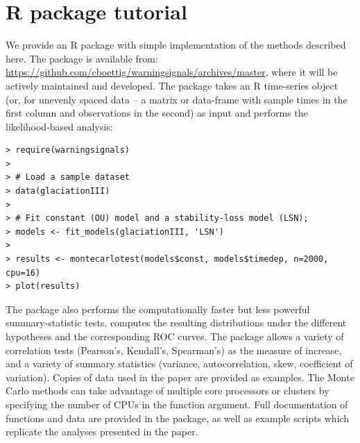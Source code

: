\documentclass[11pt]{elsarticle}
\begin{document}
%
\appendix
\renewcommand*\thefigure{S\arabic{figure}}
\renewcommand*\theequation{S\arabic{equation}}


\section{R package tutorial}\label{R}
We provide an R package with simple implementation of the methods described here.  The package is available from: \href{https://github.com/cboettig/warningsignals/archives/master}{https://github.com/cboettig/warningsignals/archives/master}, where it will be actively maintained and developed.  The package takes an R time-series object (or, for unevenly spaced data -- a matrix or data-frame with sample times in the first column and observations in the second) as input and performs the likelihood-based analysis:

\begin{verbatim}
> require(warningsignals)
>
> # Load a sample dataset
> data(glaciationIII)
>
> # Fit constant (OU) model and a stability-loss model (LSN);
> models <- fit_models(glaciationIII, 'LSN')
>
> results <- montecarlotest(models$const, models$timedep, n=2000, cpu=16)
> plot(results)
\end{verbatim}

The package also performs the computationally faster but less powerful summary-statistic tests, computes the resulting distributions under the different hypotheses and the corresponding ROC curves.  The package allows a variety of correlation tests (Pearson's, Kendall's, Spearman's) as the measure of increase, and a variety of summary statistics (variance, autocorrelation, skew, coefficient of variation).  Copies of data used in the paper are provided as examples.  The Monte Carlo methods can take advantage of multiple core processors or clusters by specifying the number of CPUs in the function argument.   Full documentation of functions and data are provided in the package, as well as example scripts which replicate the analyses presented in the paper.   
\end{document}
